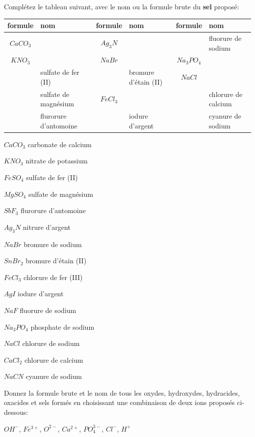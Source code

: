 \documentclass[
  11pt,
  french,
  a4paper,
  openany]{book}
\begin{document}
\begin{Exercise}
Complétez le tableau suivant, avec le nom ou la formule brute du \textbf{sel} proposé:

\end{Exercise}

\begin{longtable}[]{@{}clclcl@{}}
\toprule
formule & nom & formule & nom & formule & nom\tabularnewline
\midrule
\endhead
\(CaCO_3\) & & \(Ag_3N\) & & & fluorure de sodium\tabularnewline
\(KNO_3\) & & \(NaBr\) & & \(Na_3PO_4\) &\tabularnewline
& sulfate de fer (II) & & bromure d'étain (II) & \(NaCl\) &\tabularnewline
& sulfate de magnésium & \(FeCl_3\) & & & chlorure de calcium\tabularnewline
& flurorure d'antomoine & & iodure d'argent & & cyanure de sodium\tabularnewline
\bottomrule
\end{longtable}

\begin{Answer}

\begin{multicols}{3}
\(CaCO_3\) carbonate de calcium

\(KNO_3\) nitrate de potassium

\(FeSO_4\) sulfate de fer (II)

\(MgSO_4\) sulfate de magnésium

\(SbF_3\) flurorure d'antomoine

\(Ag_3N\) nitrure d'argent

\(NaBr\) bromure de sodium

\(SnBr_2\) bromure d'étain (II)

\(FeCl_3\) chlorure de fer (III)

\(AgI\) iodure d'argent

\(NaF\) fluorure de sodium

\(Na_3PO_4\) phosphate de sodium

\(NaCl\) chlorure de sodium

\(CaCl_2\) chlorure de calcium

\(NaCN\) cyanure de sodium

\end{multicols}


\end{Answer}

\begin{Exercise}
Donnez la formule brute et le nom de tous les oxydes, hydroxydes, hydracides, oxacides et sels formés en choisissant une combinaison de deux ions proposés ci-dessous:

\(OH^-\), \(Fe^{3+}\), \(O^{2-}\), \(Ca^{2+}\), \(PO_4^{3-}\), \(Cl^-\), \(H^+\)

\end{Exercise}
\end{document}
